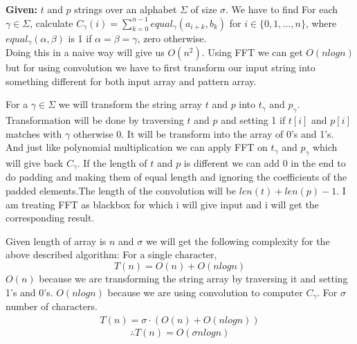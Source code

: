 \documentclass[a4paper,11pt]{article}
\theoremstyle{quest}
\newenvironment{solution}[2][Solution]{\begin{trivlist}
		\item[\hskip \labelsep {\bfseries #1}\hskip \labelsep {\bfseries #2.}]}{\end{trivlist}}
\begin{document}
\newpage
\begin{solution}3
	\textbf{Given:} $t$ and $p$ strings over an alphabet $\Sigma$ of size
	$\sigma$.
	We have to find For each $\gamma \in \Sigma$, calculate $C_{\gamma}(i) =
	\sum_{k=0}^{n-1} equal_{\gamma}(a_{i+k},b_k)$ for $i \in \{ 0, 1,
	\dots, n \}$, where $equal_{\gamma}(\alpha,\beta)$ is 1 if
	$\alpha=\beta=\gamma$, zero otherwise.\\
	
	Doing this in a naive way will give us $O(n^2)$. Using FFT we can get $O(nlogn)$ but for using convolution we have to first transform our input string into something different for both input array and pattern array.
	
	For a $\gamma \in \Sigma$ we will transform the string array $t$ and $p$ into $t_{\gamma}$ and $p_{\gamma}$. Transformation will be done by traversing $t$ and $p$ and setting 1 if $t[i]$ and $p[i]$ matches with $\gamma$ otherwise 0. It will be transform into the array of 0's and 1's. And just like polynomial multiplication we can apply FFT on $t_{\gamma}$ and $p_{\gamma}$ which will give back $C_{\gamma}$. If the length of $t$ and $p$ is different we can add 0 in the end to do padding and making them of equal length and ignoring the coefficients of the padded elements.The length of the convolution will be $len(t)+len(p)-1$.  I am treating FFT as blackbox for which i will give input and i will get the corresponding result.
	
	Given length of array is $n$ and $\sigma$ we will get the following complexity for the above described algorithm:
	For a single character,
	\begin{equation*}
	T(n) = O(n) + O(nlogn)
	\end{equation*}
	$O(n)$ because we are transforming the string array by traversing it and setting 1's and 0's. $O(nlogn)$ because we are using convolution to computer $C_{\gamma}$.
	For $\sigma$ number of characters.
	\begin{align}
	T(n) = \sigma \cdot (O(n) + O(nlogn))
	\end{align}
	\begin{equation*}
	\boxed{\therefore T(n) = O(\sigma nlogn)}
	\end{equation*}
	\begin{algorithm}
		\begin{algorithmic}
			\EndFunction\\
			\Else
			\EndIf
			\EndFor
			\EndFunction	
		\end{algorithmic} 	
	\end{algorithm}
\end{solution}
\end{document}
